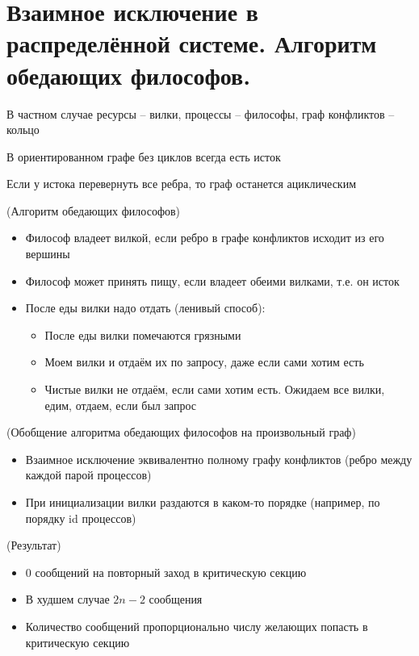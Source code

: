 \section{Взаимное исключение в распределённой системе. Алгоритм обедающих философов.}

\begin{definition}
    В частном случае ресурсы -- вилки, процессы -- философы, граф конфликтов -- кольцо
\end{definition}

\begin{theorem}
    В ориентированном графе без циклов всегда есть исток
\end{theorem}
\begin{theorem}
    Если у истока перевернуть все ребра, то граф останется ациклическим
\end{theorem}

\begin{algorithm}(Алгоритм обедающих философов)
\begin{itemize}
    \item Философ владеет вилкой, если ребро в графе конфликтов исходит из его вершины
    \item Философ может принять пищу, если владеет обеими вилками, т.е. он исток
    \item После еды вилки надо отдать (ленивый способ):
        \begin{itemize}
            \item После еды вилки помечаются грязными
            \item Моем вилки и отдаём их по запросу, даже если сами хотим есть
            \item Чистые вилки не отдаём, если сами хотим есть. Ожидаем все вилки, едим, отдаем, если был запрос
        \end{itemize}
\end{itemize}
\end{algorithm}

\begin{algorithm}(Обобщение алгоритма обедающих философов на произвольный граф)
\begin{itemize}
    \item Взаимное исключение эквивалентно полному графу конфликтов (ребро между каждой парой процессов)
    \item При инициализации вилки раздаются в каком-то порядке (например, по порядку id процессов)
\end{itemize}
\end{algorithm}

\begin{remark} (Результат)
    \begin{itemize}
        \item 0 сообщений на повторный заход в критическую секцию
        \item В худшем случае $2n-2$ сообщения
        \item Количество сообщений пропорционально числу желающих попасть в критическую секцию
    \end{itemize}
\end{remark}

